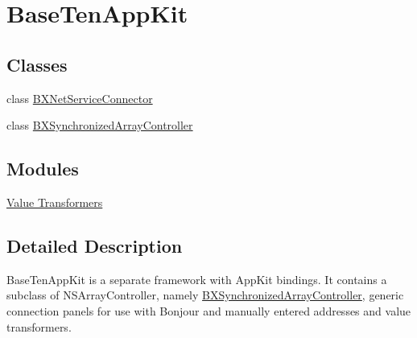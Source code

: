\hypertarget{group__baseten__appkit}{}\section{Base\+Ten\+App\+Kit}
\label{group__baseten__appkit}
\subsection*{Classes}
\begin{DoxyCompactItemize}
\item 
class \hyperlink{interface_b_x_net_service_connector}{B\+X\+Net\+Service\+Connector}
\item 
class \hyperlink{interface_b_x_synchronized_array_controller}{B\+X\+Synchronized\+Array\+Controller}
\end{DoxyCompactItemize}
\subsection*{Modules}
\begin{DoxyCompactItemize}
\item 
\hyperlink{group__value__transformers}{Value Transformers}
\end{DoxyCompactItemize}


\subsection{Detailed Description}
Base\+Ten\+App\+Kit is a separate framework with App\+Kit bindings. It contains a subclass of N\+S\+Array\+Controller, namely \hyperlink{interface_b_x_synchronized_array_controller}{B\+X\+Synchronized\+Array\+Controller}, generic connection panels for use with Bonjour and manually entered addresses and value transformers. 